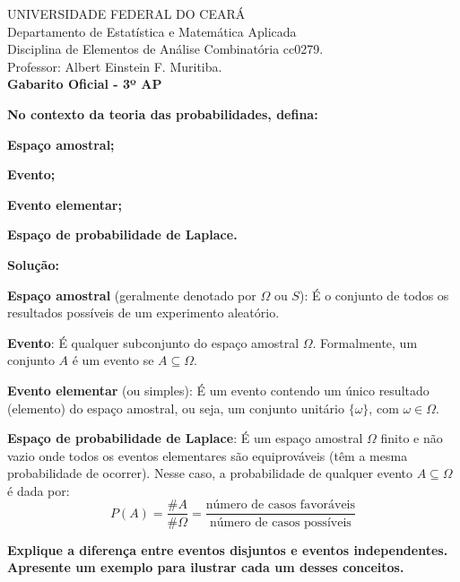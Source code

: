 \documentclass[a4paper,10pt,landscape,twocolumn]{article}  %
\let\oldenumerate\enumerate
\let\oldendenumerate\endenumerate
\renewenvironment{enumerate}{%
  \oldenumerate%
  \setlength{\itemsep}{1pt}%
  \setlength{\parskip}{0pt}%
  \setlength{\parsep}{0pt}%
  \setlength{\topsep}{2pt}%
  \setlength{\partopsep}{0pt}%
}{%
  \oldendenumerate%
}
\begin{document}
\footnotesize
\thispagestyle{empty}

UNIVERSIDADE FEDERAL DO CEARÁ\\
Departamento de Estatística e Matemática Aplicada\\
Disciplina de Elementos de Análise Combinatória cc0279.\\
Professor: Albert Einstein F. Muritiba.\\
\textbf{Gabarito Oficial - 3º AP} \\[0.2cm]

\begin{enumerate}
    
    \item \textbf{No contexto da teoria das probabilidades, defina:}
    \begin{enumerate}
        \item \textbf{Espaço amostral;}
        \item \textbf{Evento;}
        \item \textbf{Evento elementar;}
        \item \textbf{Espaço de probabilidade de Laplace.}
    \end{enumerate}
    
    \textbf{Solução:}
    \begin{enumerate}
        \item \textbf{Espaço amostral} (geralmente denotado por $\Omega$ ou $S$): É o conjunto de todos os resultados possíveis de um experimento aleatório.
        \item \textbf{Evento}: É qualquer subconjunto do espaço amostral $\Omega$. Formalmente, um conjunto $A$ é um evento se $A \subseteq \Omega$.
        \item \textbf{Evento elementar} (ou simples): É um evento contendo um único resultado (elemento) do espaço amostral, ou seja, um conjunto unitário $\{\omega\}$, com $\omega \in \Omega$.
        \item \textbf{Espaço de probabilidade de Laplace}: É um espaço amostral $\Omega$ finito e não vazio onde todos os eventos elementares são equiprováveis (têm a mesma probabilidade de ocorrer). Nesse caso, a probabilidade de qualquer evento $A \subseteq \Omega$ é dada por:
        \[ P(A) = \frac{\# A}{\# \Omega} = \frac{\text{número de casos favoráveis}}{\text{número de casos possíveis}} \]
    \end{enumerate}
    
    \item \textbf{Explique a diferença entre eventos disjuntos e eventos independentes. Apresente um exemplo para ilustrar cada um desses conceitos.}
    

\end{enumerate}
\end{document}

